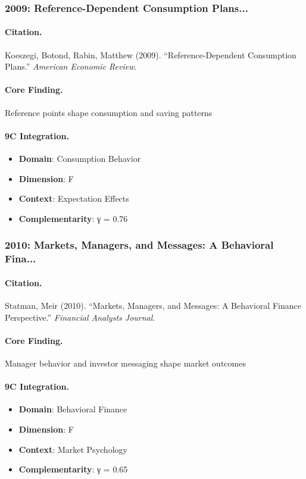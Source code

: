 \subsubsection{2009: Reference-Dependent Consumption Plans...}

\paragraph{Citation.}
Koeszegi, Botond, Rabin, Matthew (2009). ``Reference-Dependent Consumption Plans.''
\textit{American Economic Review}.

\paragraph{Core Finding.}
Reference points shape consumption and saving patterns

\paragraph{9C Integration.}
\begin{itemize}[nosep]
  \item \textbf{Domain}: Consumption Behavior
  \item \textbf{Dimension}: F
  \item \textbf{Context}: Expectation Effects
  \item \textbf{Complementarity}: γ = 0.76
\end{itemize}

\subsubsection{2010: Markets, Managers, and Messages: A Behavioral Fina...}

\paragraph{Citation.}
Statman, Meir (2010). ``Markets, Managers, and Messages: A Behavioral Finance Perspective.''
\textit{Financial Analysts Journal}.

\paragraph{Core Finding.}
Manager behavior and investor messaging shape market outcomes

\paragraph{9C Integration.}
\begin{itemize}[nosep]
  \item \textbf{Domain}: Behavioral Finance
  \item \textbf{Dimension}: F
  \item \textbf{Context}: Market Psychology
  \item \textbf{Complementarity}: γ = 0.65
\end{itemize}

